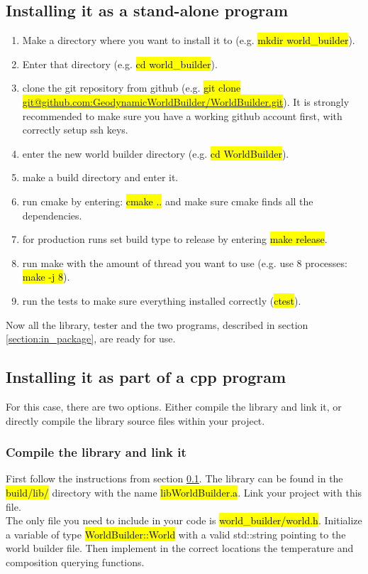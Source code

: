 \documentclass{book}
\begin{document}
\subsection{Installing it as a stand-alone program}
\label{subsection:install_stand_aline}
\begin{enumerate}
    \item Make a directory where you want to install it to (e.g. \hl{mkdir world\_builder}).
    \item Enter that directory (e.g. \hl{cd world\_builder}).
    \item clone the git repository from github (e.g. \hl{git clone  \\ \hbox{\url{ git@github.com:GeodynamicWorldBuilder/WorldBuilder.git}}}). It is strongly recommended to make sure you have a working github account first, with correctly setup ssh keys.
    \item enter the new world builder directory (e.g. \hl{cd WorldBuilder}).
    \item make a build directory and enter it.
    \item run cmake by entering: \hl{cmake ..} and make sure cmake finds all the dependencies.
    \item for production runs set build type to release by entering \hl{make release}.
    \item run make with the amount of thread you want to use (e.g. use 8 processes: \hl{make -j 8}).
    \item run the tests to make sure everything installed correctly (\hl{ctest}).
\end{enumerate}
Now all the library, tester and the two programs, described in section \ref{section:in_package}, are ready for use.

\subsection{Installing it as part of a cpp program}
For this case, there are two options. Either compile the library and link it, or directly compile the library source files within your project.

\subsubsection{Compile the library and link it}
First follow the instructions from section \ref{subsection:install_stand_aline}. The library can be found in the \hl{build/lib/} directory with the name \hl{libWorldBuilder.a}. Link your project with this file. 
\\
The only file you need to include in your code is \hl{world\_builder/world.h}. Initialize a variable of type \hl{WorldBuilder::World} with a valid std::string pointing to the world builder file. Then implement in the correct locations the temperature and composition querying functions.
\end{document}
